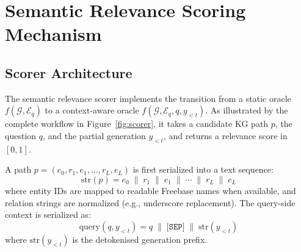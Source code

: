 \section{Semantic Relevance Scoring Mechanism}
\label{sec:ch3scorer}

\subsection{Scorer Architecture}

The semantic relevance scorer implements the transition from a static oracle $f(\mathcal{G}, \mathcal{E}_q)$ to a context-aware oracle $f(\mathcal{G}, \mathcal{E}_q, q, y_{<t})$. As illustrated by the complete workflow in Figure~\ref{fig:scorer}, it takes a candidate KG path $p$, the question $q$, and the partial generation $y_{<t}$, and returns a relevance score in $[0,1]$.

A path $p = (e_0, r_1, e_1, \ldots, r_L, e_L)$ is first serialized into a text sequence:
\begin{equation}
  \text{str}(p) = e_0 \;\|\; r_1 \;\|\; e_1 \;\|\; \cdots \;\|\; r_L \;\|\; e_L
  \label{eq:pathstr}
\end{equation}
where entity IDs are mapped to readable Freebase names when available, and relation strings are normalized (e.g., underscore replacement). The query-side context is serialized as:
\begin{equation}
  \text{query}(q, y_{<t}) = q \;\|\; \texttt{[SEP]} \;\|\;
  \text{str}(y_{<t})
  \label{eq:querystr}
\end{equation}
where $\text{str}(y_{<t})$ is the detokenised generation prefix.

